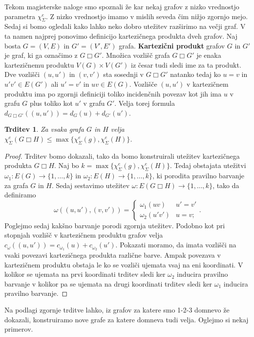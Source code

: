 \documentclass[12pt,a4paper,twoside]{article}
\theoremstyle{definition} %
\theoremstyle{plain} %
\newtheorem{trditev}[definicija]{Trditev}
\newcommand{\ec}{\chi_{\Sigma}^e}
\numberwithin{equation}{section}  %
\begin{document}
Tekom magisterske naloge smo spoznali že kar nekaj grafov z nizko vrednostjo parametra $\ec$. Z nizko vrednostjo imamo v mislih seveda čim nižjo zgornjo mejo. Sedaj si bomo ogledali kako lahko neko dobro utežitev razširimo na večji graf. V ta namen najprej ponovimo definicijo kartezičnega produkta dveh grafov. Naj bosta $G =(V, E)$ in $G' = (V', E')$ grafa.  \textbf{Kartezični produkt} grafov $G$ in $G'$ je graf, ki ga označimo z $G \Box G'$. Množica vozlišč grafa  $G \Box G'$ je enaka kartezičnemu produktu $V(G) \times V(G')$ iz česar tudi sledi ime za ta produkt. Dve vozlišči $(u, u')$ in $(v, v')$ sta sosednji v $G \Box G'$ natanko tedaj ko $u=v$ in $u'v' \in E(G')$ ali $u' = v'$ in $uv \in E(G)$. Vozlišče $(u, u')$ v kartezičnem produktu ima po zgornji definiciji toliko incidenčnih povezav kot jih ima $u$ v grafu $G$ plus toliko kot $u'$ v grafu $G'$. Velja torej formula $d_{G \Box G'}((u, u')) = d_G(u) + d_{G'}(u')$.
\begin{trditev}
Za vsaka grafa $G$ in $H$ velja $\ec(G \Box H) \le \max \{\ec(g), \ec(H)\}$.
\end{trditev}
\begin{proof}
Trditev bomo dokazali, tako da bomo konstruirali utežitev kartezičnega produkta  $G \Box H$. Naj bo $k =\max \{\ec(g), \ec(H)\} $. Tedaj obstajata utežitvi $\omega_1 : E(G) \rightarrow \{1, \ldots, k\}$ in $\omega_2 : E(H)\rightarrow \{1, \ldots, k\}$, ki porodita pravilno barvanje za grafa $G$ in $H$. Sedaj sestavimo utežitev $\omega : E(G \Box H) \rightarrow \{1, \ldots, k\}$, tako da definiramo 
\begin{equation*}
\omega((u, u'), (v, v')) = \begin{cases}
	\omega_1(uv) & u' = v'\\ 
	\omega_2(u'v') & u = v;
	\end{cases}.
\end{equation*}
Poglejmo sedaj kakšno barvanje porodi zgornja utežitev. Podobno kot pri stopnjah vozlišč v kartezičnem produktu grafov velja $c_{\omega}((u, u')) = c_{\omega_1}(u) + c_{\omega_2}(u')$. Pokazati moramo, da imata vozlišči na vsaki povezavi kartezičnega produkta različne barve. Ampak povezava v kartezičnem produktu obstaja le ko se vozliči ujemata vsaj na eni koordinati. V kolikor se ujemata na prvi koordinati trditev sledi ker $\omega_2$ inducira pravilno barvanje v kolikor pa se ujemata na drugi koordinati trditev sledi ker $\omega_1$ inducira pravilno barvanje.
\end{proof}
Na podlagi zgornje trditve lahko, iz grafov za katere smo 1-2-3 domnevo že dokazali, konstruiramo nove grafe za katere domneva tudi velja. Oglejmo si nekaj primerov.
\end{document}
